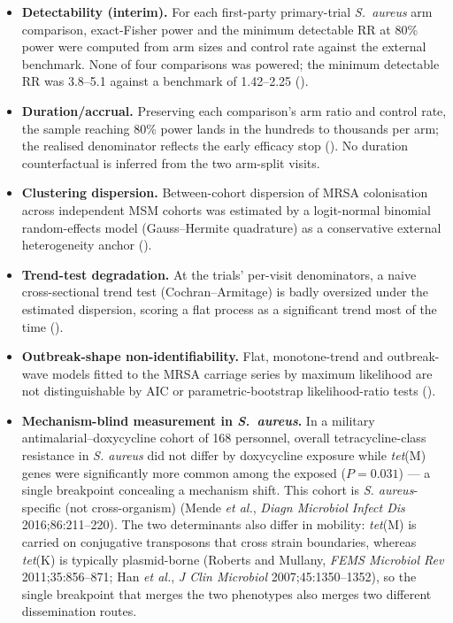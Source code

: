 \documentclass[11pt,a4paper]{article}
\newcommand{\sa}{\emph{S.~aureus}}
\begin{document}
\begin{itemize}
\item \textbf{Detectability (interim).} For each first-party primary-trial \sa{}
arm comparison, exact-Fisher power and the minimum detectable RR at 80\% power
were computed from arm sizes and control rate against the external benchmark. None
of four comparisons was powered; the minimum detectable RR was 3.8--5.1 against a
benchmark of 1.42--2.25 ().
\item \textbf{Duration/accrual.} Preserving each comparison's arm ratio and
control rate, the sample reaching 80\% power lands in the hundreds to thousands per
arm; the realised denominator reflects the early efficacy stop
(). No duration counterfactual is inferred from
the two arm-split visits.
\item \textbf{Clustering dispersion.} Between-cohort dispersion of MRSA
colonisation across independent MSM cohorts was estimated by a logit-normal
binomial random-effects model (Gauss--Hermite quadrature) as a conservative
external heterogeneity anchor ().
\item \textbf{Trend-test degradation.} At the trials' per-visit denominators, a
naive cross-sectional trend test (Cochran--Armitage) is badly oversized under the
estimated dispersion, scoring a flat process as a significant trend most of the
time ().
\item \textbf{Outbreak-shape non-identifiability.} Flat, monotone-trend and
outbreak-wave models fitted to the MRSA carriage series by maximum likelihood are
not distinguishable by AIC or parametric-bootstrap likelihood-ratio tests
().
\item \textbf{Mechanism-blind measurement in \sa{}.} In a
military antimalarial--doxycycline cohort of 168 personnel, overall
tetracycline-class resistance in \emph{S. aureus} did not differ by doxycycline
exposure while \emph{tet}(M) genes were significantly more common among the
exposed ($P=0.031$) --- a single breakpoint concealing a mechanism shift. This
cohort is \emph{S. aureus}-specific (not cross-organism) (Mende \textit{et al.}, \textit{Diagn Microbiol
Infect Dis} 2016;86:211--220). The two determinants also differ in mobility:
\emph{tet}(M) is carried on conjugative transposons that cross strain boundaries,
whereas \emph{tet}(K) is typically plasmid-borne (Roberts and Mullany, \textit{FEMS
Microbiol Rev} 2011;35:856--871; Han \textit{et al.}, \textit{J Clin Microbiol}
2007;45:1350--1352), so the single breakpoint that merges the two phenotypes also
merges two different dissemination routes.
\end{itemize}
\end{document}

